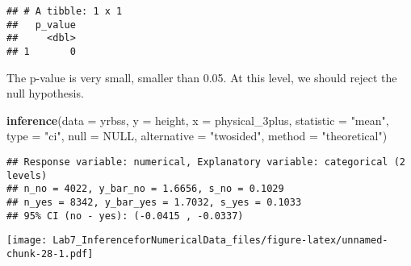 \documentclass[
]{article}
\newenvironment{Shaded}{\begin{snugshade}}{\end{snugshade}}
\newcommand{\CommentTok}[1]{\textcolor[rgb]{0.56,0.35,0.01}{\textit{#1}}}
\newcommand{\DataTypeTok}[1]{\textcolor[rgb]{0.13,0.29,0.53}{#1}}
\newcommand{\DecValTok}[1]{\textcolor[rgb]{0.00,0.00,0.81}{#1}}
\newcommand{\FloatTok}[1]{\textcolor[rgb]{0.00,0.00,0.81}{#1}}
\newcommand{\KeywordTok}[1]{\textcolor[rgb]{0.13,0.29,0.53}{\textbf{#1}}}
\newcommand{\NormalTok}[1]{#1}
\newcommand{\OperatorTok}[1]{\textcolor[rgb]{0.81,0.36,0.00}{\textbf{#1}}}
\newcommand{\OtherTok}[1]{\textcolor[rgb]{0.56,0.35,0.01}{#1}}
\newcommand{\StringTok}[1]{\textcolor[rgb]{0.31,0.60,0.02}{#1}}
\begin{document}
\begin{verbatim}
## # A tibble: 1 x 1
##   p_value
##     <dbl>
## 1       0
\end{verbatim}

The p-value is very small, smaller than 0.05. At this level, we should
reject the null hypothesis.

\begin{Shaded}
\begin{Highlighting}[]
\KeywordTok{inference}\NormalTok{(}\DataTypeTok{data =}\NormalTok{ yrbss, }\DataTypeTok{y =}\NormalTok{ height, }\DataTypeTok{x =}\NormalTok{ physical_3plus,}
          \DataTypeTok{statistic =} \StringTok{"mean"}\NormalTok{,}
          \DataTypeTok{type =} \StringTok{"ci"}\NormalTok{, }
          \DataTypeTok{null =} \OtherTok{NULL}\NormalTok{, }
          \DataTypeTok{alternative =} \StringTok{"twosided"}\NormalTok{, }
          \DataTypeTok{method =} \StringTok{"theoretical"}\NormalTok{)}
\end{Highlighting}
\end{Shaded}

\begin{verbatim}
## Response variable: numerical, Explanatory variable: categorical (2 levels)
## n_no = 4022, y_bar_no = 1.6656, s_no = 0.1029
## n_yes = 8342, y_bar_yes = 1.7032, s_yes = 0.1033
## 95% CI (no - yes): (-0.0415 , -0.0337)
\end{verbatim}

\texttt{[image: Lab7\_InferenceforNumericalData\_files/figure-latex/unnamed-chunk-28-1.pdf]}

\begin{Shaded}
\end{Shaded}
\end{document}
